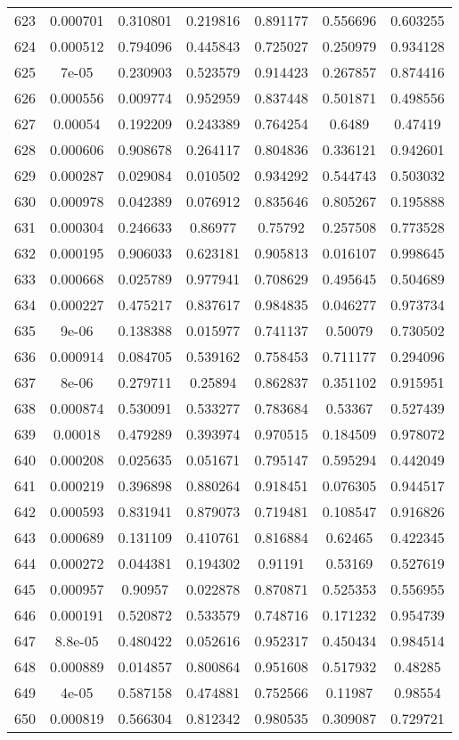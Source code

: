 \begin{table}
\begin{tabular}{c|c|c|c|c|c|c}
623 & 0.000701 & 0.310801 & 0.219816 & 0.891177 & 0.556696 & 0.603255\\
624 & 0.000512 & 0.794096 & 0.445843 & 0.725027 & 0.250979 & 0.934128\\
625 & 7e-05 & 0.230903 & 0.523579 & 0.914423 & 0.267857 & 0.874416\\
626 & 0.000556 & 0.009774 & 0.952959 & 0.837448 & 0.501871 & 0.498556\\
627 & 0.00054 & 0.192209 & 0.243389 & 0.764254 & 0.6489 & 0.47419\\
628 & 0.000606 & 0.908678 & 0.264117 & 0.804836 & 0.336121 & 0.942601\\
629 & 0.000287 & 0.029084 & 0.010502 & 0.934292 & 0.544743 & 0.503032\\
630 & 0.000978 & 0.042389 & 0.076912 & 0.835646 & 0.805267 & 0.195888\\
631 & 0.000304 & 0.246633 & 0.86977 & 0.75792 & 0.257508 & 0.773528\\
632 & 0.000195 & 0.906033 & 0.623181 & 0.905813 & 0.016107 & 0.998645\\
633 & 0.000668 & 0.025789 & 0.977941 & 0.708629 & 0.495645 & 0.504689\\
634 & 0.000227 & 0.475217 & 0.837617 & 0.984835 & 0.046277 & 0.973734\\
635 & 9e-06 & 0.138388 & 0.015977 & 0.741137 & 0.50079 & 0.730502\\
636 & 0.000914 & 0.084705 & 0.539162 & 0.758453 & 0.711177 & 0.294096\\
637 & 8e-06 & 0.279711 & 0.25894 & 0.862837 & 0.351102 & 0.915951\\
638 & 0.000874 & 0.530091 & 0.533277 & 0.783684 & 0.53367 & 0.527439\\
639 & 0.00018 & 0.479289 & 0.393974 & 0.970515 & 0.184509 & 0.978072\\
640 & 0.000208 & 0.025635 & 0.051671 & 0.795147 & 0.595294 & 0.442049\\
641 & 0.000219 & 0.396898 & 0.880264 & 0.918451 & 0.076305 & 0.944517\\
642 & 0.000593 & 0.831941 & 0.879073 & 0.719481 & 0.108547 & 0.916826\\
643 & 0.000689 & 0.131109 & 0.410761 & 0.816884 & 0.62465 & 0.422345\\
644 & 0.000272 & 0.044381 & 0.194302 & 0.91191 & 0.53169 & 0.527619\\
645 & 0.000957 & 0.90957 & 0.022878 & 0.870871 & 0.525353 & 0.556955\\
646 & 0.000191 & 0.520872 & 0.533579 & 0.748716 & 0.171232 & 0.954739\\
647 & 8.8e-05 & 0.480422 & 0.052616 & 0.952317 & 0.450434 & 0.984514\\
648 & 0.000889 & 0.014857 & 0.800864 & 0.951608 & 0.517932 & 0.48285\\
649 & 4e-05 & 0.587158 & 0.474881 & 0.752566 & 0.11987 & 0.98554\\
650 & 0.000819 & 0.566304 & 0.812342 & 0.980535 & 0.309087 & 0.729721\\
\end{tabular}
\end{table}

